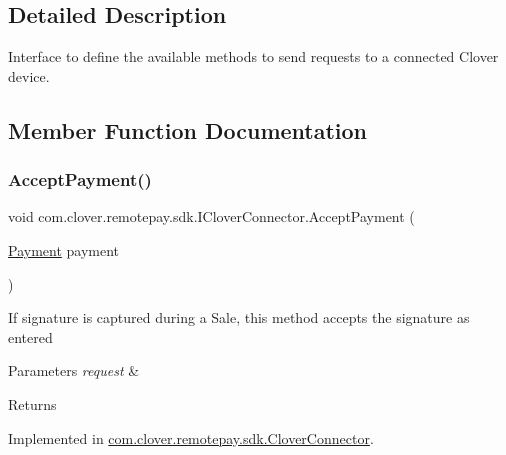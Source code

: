\subsection{Detailed Description}
Interface to define the available methods to send requests to a connected Clover device. 



\subsection{Member Function Documentation}
\mbox{\label{interfacecom_1_1clover_1_1remotepay_1_1sdk_1_1_i_clover_connector_ad6286e6d5ec3157f3ceeafc1de504dff}} 
\subsubsection{\texorpdfstring{Accept\+Payment()}{AcceptPayment()}}
{\footnotesize\ttfamily void com.\+clover.\+remotepay.\+sdk.\+I\+Clover\+Connector.\+Accept\+Payment (\begin{DoxyParamCaption}\item[{\hyperlink{classcom_1_1clover_1_1sdk_1_1v3_1_1payments_1_1_payment}{Payment}}]{payment }\end{DoxyParamCaption})}



If signature is captured during a Sale, this method accepts the signature as entered 


\begin{DoxyParams}{Parameters}
{\em request} & \\
\hline
\end{DoxyParams}
\begin{DoxyReturn}{Returns}

\end{DoxyReturn}


Implemented in \hyperlink{classcom_1_1clover_1_1remotepay_1_1sdk_1_1_clover_connector_afe33a1ba414608b2b05a3336128c7b5c}{com.\+clover.\+remotepay.\+sdk.\+Clover\+Connector}.

\mbox{\label{interfacecom_1_1clover_1_1remotepay_1_1sdk_1_1_i_clover_connector_ab31791ce69e05ca2e2b15269c2010a15}} 

